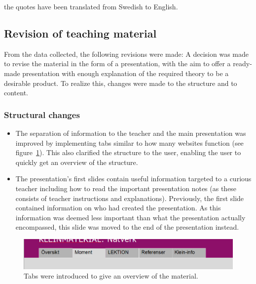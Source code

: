  the quotes have been translated from Swedish to English.

\subsection{Revision of teaching material}
From the data collected, the following revisions were made:
A decision was made to revise the material in the form of a presentation, with the aim to offer a ready-made presentation with enough explanation of the required theory to be a desirable product. To realize this, changes were made to the structure and to content.
\subsubsection*{Structural changes}
\begin{itemize}
    \item The separation of information to the teacher and the main presentation was improved by implementing tabs similar to how many websites function (see figure~\ref{tabs}). This also clarified the structure to the user, enabling the user to quickly get an overview of the structure.
    \item The presentation's first slides contain useful information targeted to a curious teacher including how to read the important presentation notes (as these consists of teacher instructions and explanations). Previously, the first slide contained information on who had created the presentation. As this information was deemed less important than what the presentation actually encompassed, this slide was moved to the end of the presentation instead.
\end{itemize}

\begin{figure}[H]
\centering
\includegraphics[width=\linewidth]{figure/tabs2.png}
\caption{Tabs were introduced to give an overview of the material.}
\label{tabs}
\end{figure}


